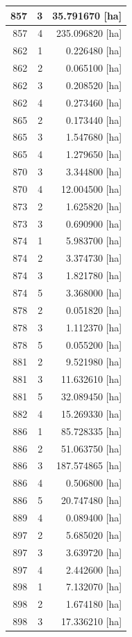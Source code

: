 \documentclass[11pt,]{book}
\begin{document}
\begin{table}
\begin{tabular}[t]{r|r|r}
\hline
857 & 3 & 35.791670 [ha]\\
\hline
857 & 4 & 235.096820 [ha]\\
\hline
862 & 1 & 0.226480 [ha]\\
\hline
862 & 2 & 0.065100 [ha]\\
\hline
862 & 3 & 0.208520 [ha]\\
\hline
862 & 4 & 0.273460 [ha]\\
\hline
865 & 2 & 0.173440 [ha]\\
\hline
865 & 3 & 1.547680 [ha]\\
\hline
865 & 4 & 1.279650 [ha]\\
\hline
870 & 3 & 3.344800 [ha]\\
\hline
870 & 4 & 12.004500 [ha]\\
\hline
873 & 2 & 1.625820 [ha]\\
\hline
873 & 3 & 0.690900 [ha]\\
\hline
874 & 1 & 5.983700 [ha]\\
\hline
874 & 2 & 3.374730 [ha]\\
\hline
874 & 3 & 1.821780 [ha]\\
\hline
874 & 5 & 3.368000 [ha]\\
\hline
878 & 2 & 0.051820 [ha]\\
\hline
878 & 3 & 1.112370 [ha]\\
\hline
878 & 5 & 0.055200 [ha]\\
\hline
881 & 2 & 9.521980 [ha]\\
\hline
881 & 3 & 11.632610 [ha]\\
\hline
881 & 5 & 32.089450 [ha]\\
\hline
882 & 4 & 15.269330 [ha]\\
\hline
886 & 1 & 85.728335 [ha]\\
\hline
886 & 2 & 51.063750 [ha]\\
\hline
886 & 3 & 187.574865 [ha]\\
\hline
886 & 4 & 0.506800 [ha]\\
\hline
886 & 5 & 20.747480 [ha]\\
\hline
889 & 4 & 0.089400 [ha]\\
\hline
897 & 2 & 5.685020 [ha]\\
\hline
897 & 3 & 3.639720 [ha]\\
\hline
897 & 4 & 2.442600 [ha]\\
\hline
898 & 1 & 7.132070 [ha]\\
\hline
898 & 2 & 1.674180 [ha]\\
\hline
898 & 3 & 17.336210 [ha]\\

\end{tabular}
\end{table}
\end{document}
